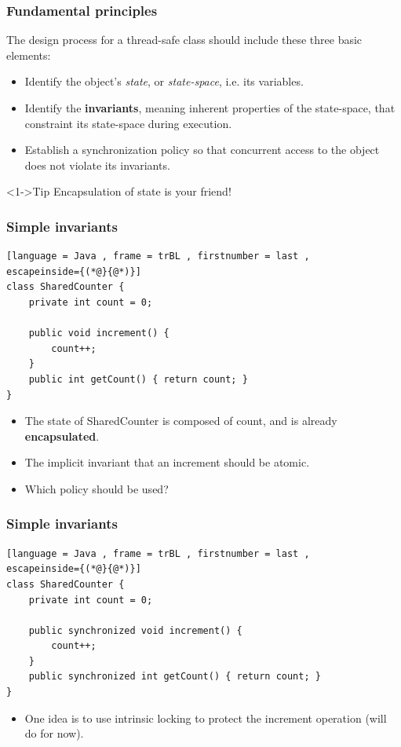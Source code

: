 \documentclass[xcolor={dvipsnames,svgnames},aspectratio=169]{beamer}
\begin{document}
\begin{frame}[fragile]
  \frametitle{Fundamental principles}

  The design process for a thread-safe class should
  include these three basic elements:

  \begin{itemize}
  \item[\faBook]<1-> Identify the object's \emph{state}, or \emph{state-space},
    i.e. its variables.
  \item[\faBook]<1-> Identify the \textbf{invariants}, meaning inherent
    properties of the state-space, that constraint its state-space
    during execution.
  \item[\faBook]<1-> Establish a synchronization policy so that concurrent
    access to  the object does not violate its invariants.
  \end{itemize}

  \pause
    \vspace{0.2cm}
    \begin{block}<1->{\faLightbulb\quad Tip}
      Encapsulation of state is your friend!
  \end{block}

\end{frame}

\begin{frame}[fragile]
  \frametitle{Simple invariants}

\begin{lstlisting}[language = Java , frame = trBL , firstnumber = last ,
escapeinside={(*@}{@*)}]
class SharedCounter {
    private int count = 0;

    public void increment() {
        count++;
    }
    public int getCount() { return count; }
}
\end{lstlisting}
    \begin{itemize}
  \item[\faBook]<2-> The state of SharedCounter is composed of count, and is
    already \textbf{encapsulated}.
  \item[\faBook]<2-> The implicit invariant that an increment should be atomic.
  \item[\faBook]<2-> Which policy should be used?
  \end{itemize}
\end{frame}

\begin{frame}[fragile]
  \frametitle{Simple invariants}

\begin{lstlisting}[language = Java , frame = trBL , firstnumber = last ,
escapeinside={(*@}{@*)}]
class SharedCounter {
    private int count = 0;

    public synchronized void increment() {
        count++;
    }
    public synchronized int getCount() { return count; }
}
\end{lstlisting}
    \begin{itemize}
  \item[\faBook]<1-> One idea is to use intrinsic locking to protect the
    increment operation (will do for now).
  \end{itemize}
\end{frame}
\end{document}

